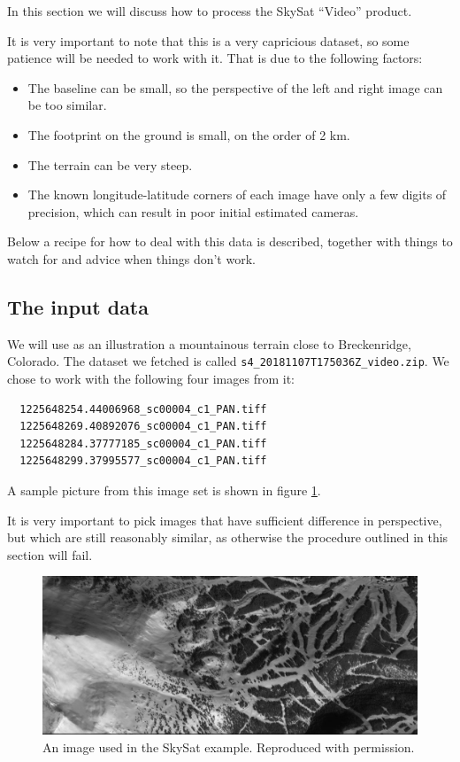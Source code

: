 In this section we will discuss how to process the SkySat ``Video'' product. 

It is very important to note that this is a very capricious dataset,
so some patience will be needed to work with it. That is due to the following factors:
\begin{itemize}
 \item The baseline can be small, so the perspective of the left and
  right image can be too similar. 
 \item The footprint on the ground is small, on the order of 2 km.
  \item The terrain can be very steep.
 \item The known longitude-latitude corners of each image have only a few digits of
precision, which can result in poor initial estimated cameras.
\end{itemize}

Below a recipe for how to deal with this data is described, together with
things to watch for and advice when things don't work. 

\subsection{The input data}

We will use as an illustration a
mountainous terrain close to Breckenridge, Colorado. The dataset we
fetched is called \texttt{s4\_20181107T175036Z\_video.zip}. We chose to
work with the following four images from it:

\begin{verbatim}
  1225648254.44006968_sc00004_c1_PAN.tiff
  1225648269.40892076_sc00004_c1_PAN.tiff
  1225648284.37777185_sc00004_c1_PAN.tiff
  1225648299.37995577_sc00004_c1_PAN.tiff
\end{verbatim}

A sample picture from this image set is
shown in figure \ref{skysat-example}.

It is very important to pick images that have sufficient difference in
perspective, but which are still reasonably similar, as otherwise the
procedure outlined in this section will fail. 

\begin{figure}[h!]
\centering
\includegraphics[width=5.0in]{images/Breckenridge.jpg}
\caption{An image used in the SkySat example. Reproduced with permission.}
\label{skysat-example}
\end{figure}

